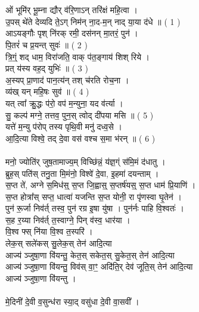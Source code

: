 \section{}
ओं भूमि॑र् भू॒म्ना द्यौर् व॑रि॒णाऽन् तरि॑क्षं महि॒त्वा ।\\
उ॒पस् थे॑ते देव्यदि ते॒ऽग् निम॑न् ना॒द-म॒न् नाद् या॒या द॑धे ॥   ( 1 )\\
आऽयङ्गौः पृश् नि॑रक् रमी॒ दस॑नन् मा॒तरं॒ पुन॑ ।\\
पि॒तरं॑ च प्र॒यन्त् सुवः॑ ॥ ( 2 )\\
त्रि॒ग्ं॒ शद् धाम॒ विरा॑जति॒ वाक् प॑त॒ङ्गाय॑ शिश् रिये ।\\
प्रत् य॑स्य वह॒द् युभिः॑ ॥ ( 3 )\\
अ॒स्यप् प्रा॒णाद॑ पान॒त्य॑न् तश् च॑रति रोच॒ना ।\\
व्य॑ख् यन् महि॒षः सुव॑ ॥ ( 4 )\\
यत् त्वा᳚ क्रु॒द्धः प॑रो॒ वप॑ म॒न्युना॒ यद व॑र्त्या ।\\
सु॒ कल्प॑ मग्ने॒ तत्तव॒ पुन॒स् त्वोद् दी॑पया मसि ॥ ( 5 )\\
यत्ते॑ म॒न्यु प॑रोप् तस्य पृथि॒वी मनु॑ दध्व॒से ।\\
आ॒दि॒त्या विश्वे॒ तद् दे॒वा वस॑ वश्च स॒मा भ॑रन् ॥ ( 6 )\\
\\
मनो॒ ज्योति॑र् जुष॒तामाज्य॒म् विच्छि॑न्नं॒ य॑ज्ञ॒ग्ं स॑मि॒मं द॑धातु ।\\
ब्रुह॒स् पति॑स् तनु॒ता मि॒मंनो॒ विश्वे॑ दे॒वा, इ॒हमा॑ दयन्ताम् ।\\
स॒प्त ते॑, अग्ने स॒मिध॑स्॒ स॒प्त जि॒ह्वास्॒ स॒प्तर्ष॑यस्॒ स॒प्त धाम॑ प्रि॒याणि॑ ।\\
स॒प्त होत्रा᳚स् सप्त॒ धात्वा॑ यजन्ति स॒प्त योनी॒ रा पृ॑णस्वा घृ॒तेन॑ ।\\
पुन॑ रू॒र्जा निव॑र्त् तस्व॒ पुन॑ रग्र इ॒षा यु॑षा । पुन॑र्नः पाहि वि॒श्वतः॑ ।\\
स॒ह र॒य्या निव॑र्त् त॒स्वाग्ने॒ पिन् व॑स्व॒ धार॑या । \\
{\small {}} वि॒श्व फ्स् नि॑या वि॒श्व त॒स्परि॑ ।\\
लेक॒स् सले॑कस् सु॒लेक॒स् तेन॑ आदि॒त्या \\
आज्य॑ ञ्जुषा॒णा वि॑यन्तु॒ केत॒स् सकेत॒स् सु॒केत॒स् तेन॑ आदि॒त्या\\
आज्य॑ ञ्जुषा॒णा वि॑यन्तु॒ विव॑स् वा॒ꣳ॒ अदि॑ति॒र् देव॑ जूति॒स् तेन॑ आदि॒त्या\\
आज्य॑ ञ्जुषा॒णा वि॑यन्तु ।\\
\\
मे॒दिनी॑ दे॒वी व॒सुन्ध॑रा स्या॒द् वसु॑धा दे॒वी वा॒सवी᳚ ।\\
